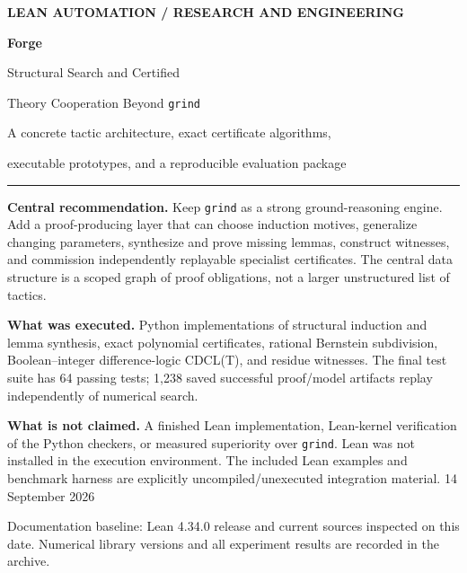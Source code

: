 \documentclass[11pt,letterpaper]{article}
\newcommand{\code}[1]{\texttt{#1}}
\theoremstyle{definition}\newtheorem{definition}[theorem]{Definition}
\theoremstyle{remark}\newtheorem{remark}[theorem]{Remark}
\begin{document}
\hypersetup{pageanchor=false}
\begin{titlepage}
\vspace*{0.45in}
{\sffamily\small\bfseries\color{inkblue} LEAN AUTOMATION / RESEARCH AND ENGINEERING}\par
\vspace{0.3in}
{\sffamily\fontsize{35}{40}\selectfont\bfseries Forge}\par
\vspace{0.15in}
{\sffamily\LARGE Structural Search and Certified\par Theory Cooperation Beyond \texttt{grind}}\par
\vspace{0.3in}
{\large A concrete tactic architecture, exact certificate algorithms,\par executable prototypes, and a reproducible evaluation package}\par
\vspace{0.4in}
\rule{\linewidth}{0.6pt}
\vspace{0.12in}
\textbf{Central recommendation.} Keep \code{grind} as a strong ground-reasoning engine. Add a proof-producing layer that can choose induction motives, generalize changing parameters, synthesize and prove missing lemmas, construct witnesses, and commission independently replayable specialist certificates. The central data structure is a scoped graph of proof obligations, not a larger unstructured list of tactics.

\textbf{What was executed.} Python implementations of structural induction and lemma synthesis, exact polynomial certificates, rational Bernstein subdivision, Boolean--integer difference-logic CDCL(T), and residue witnesses. The final test suite has 64 passing tests; 1,238 saved successful proof/model artifacts replay independently of numerical search.

\textbf{What is not claimed.} A finished Lean implementation, Lean-kernel verification of the Python checkers, or measured superiority over \code{grind}. Lean was not installed in the execution environment. The included Lean examples and benchmark harness are explicitly uncompiled/unexecuted integration material.
\vfill
{\sffamily\large 14 September 2026}\par
{\small Documentation baseline: Lean 4.34.0 release and current sources inspected on this date. Numerical library versions and all experiment results are recorded in the archive.}
\end{titlepage}
\hypersetup{pageanchor=true}
\end{document}
